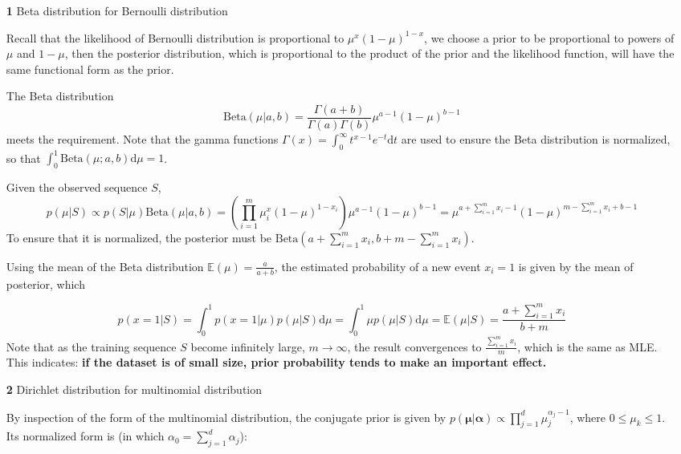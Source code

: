 \documentclass{article}
\begin{document}
	\begin{itemize}
	\item [\textbf{1}] Beta distribution for Bernoulli distribution
	
	Recall that the likelihood of Bernoulli distribution is proportional to $\mu^x (1-\mu)^{1-x}$,	we choose a prior to be proportional to powers of $\mu$ and $1-\mu$, then the posterior distribution, which is proportional to the product of the prior and the likelihood function, will have the same functional form as the prior.
	
	The Beta distribution 
	\begin{equation}
	\mathrm{Beta}(\mu|a,b)=\frac{\Gamma(a+b)}{\Gamma(a)\Gamma(b)}\mu^{a-1}(1-\mu)^{b-1}
	\end{equation}
meets the requirement. Note that the gamma functions $\Gamma(x)=\int^\infty_0 t^{x-1} e^{-t} \mathrm{d} t$ are used to ensure the Beta distribution is normalized, so that $\int_0^1 \mathrm{Beta}(\mu;a,b)\mathrm{d}\mu = 1$.
	
	Given the observed sequence $S$, 
	\begin{equation*}
	p(\mu|S) \propto p(S|\mu) \mathrm{Beta}(\mu|a,b) = \left( \prod_{i=1}^m \mu^x_i (1-\mu)^{1-x_i} \right) \mu^{a-1}(1-\mu)^{b-1} = \mu^{a+\sum_{i=1}^m x_i-1}(1-\mu)^{m-\sum_{i=1}^m x_i + b-1}
	\end{equation*}
To ensure that it is normalized, the posterior must be $\mathrm{Beta}(a+\sum_{i=1}^m x_i, b+m-\sum_{i=1}^m x_i)$.

	Using the mean of the Beta distribution $\mathbb{E}(\mu)=\frac{a}{a+b}$, the estimated probability of a new event $x_i=1$ is given by the mean of posterior, which
	
	\begin{equation*}
	p(x=1|S)=\int^1_0 p(x=1|\mu)p(\mu|S) \mathrm{d}\mu = \int^1_0 \mu p(\mu|S) \mathrm{d}\mu = \mathbb{E}(\mu|S) = \frac{a+\sum_{i=1}^m x_i}{b+m}
	\end{equation*}
Note that as the training sequence $S$ become infinitely large, $m\rightarrow\infty$, the result convergences to $\frac{\sum_{i=1}^m x_i}{m}$, which is the same as MLE. This indicates: \textbf{if the dataset is of small size, prior probability tends to make an important effect.}
	
	\item [\textbf{2}] Dirichlet distribution for multinomial distribution

	By inspection of the form of the multinomial distribution, the conjugate prior is given by $p(\bm{\mu}|\bm{\alpha})\propto \prod_{j=1}^d \mu_j^{\alpha_j-1}$, where $0\leq\mu_k\leq 1$. Its normalized form is (in which $\alpha_0=\sum_{j=1}^d \alpha_j$):
	

\end{itemize}
\end{document}
